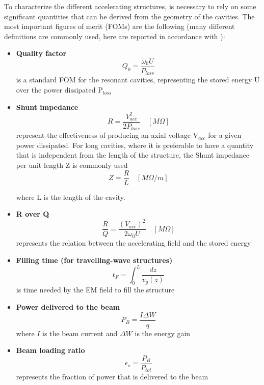 To characterize the different accelerating structures, is necessary to rely on some significant quantities that can be derived from the geometry of the cavities. The most important figures of merit (FOMs) are the following (many different definitions are commonly used, here are reported in accordance with \cite{TECKER:RFCAS}):
\begin{itemize}

\item \textbf{Quality factor} 
\begin{equation}
Q_0 = \frac{\omega_0 U}{P_{loss}} 
\end{equation}
is a standard FOM for the resonant cavities, representing the stored energy U over the power dissipated P$_{loss}$

\item \textbf{Shunt impedance} 
\begin{equation}
R = \frac{V_{acc}^2}{2P_{loss}}  \quad [M\Omega]
\end{equation}
represent the effectiveness of producing an axial voltage V$_{acc}$ for a given power dissipated. For long cavities, where it is preferable to have a quantity that is independent from the length of the structure, the Shunt impedance per unit length
 Z is commonly used 
\begin{equation}
Z = \frac{R}{L}  \quad [M\Omega / m]
\end{equation}

where L is the length of the cavity.

\item \textbf{R over Q} 
\begin{equation}
\frac{R}{Q} = \frac{(V_{acc})^2}{2\omega_0 U}  \quad [M\Omega]
\end{equation}
represents the relation between the accelerating field and the stored energy


\item \textbf{Filling time (for travelling-wave structures)}
\begin{equation}
t_F = \int_0^L \frac{dz}{v_g (z)}
\end{equation}
is time needed by the EM field to fill the structure

\item \textbf{Power delivered to the beam}
\begin{equation}
P_B = \frac{I \Delta W}{q}
\end{equation}
where $I$ is the beam current and $\Delta W$ is the energy gain

\item \textbf{Beam loading ratio}
\begin{equation}
\epsilon_s = \frac{P_B}{P_{tot}}
\end{equation}
represents the fraction of power that is delivered to the beam

\end{itemize}


